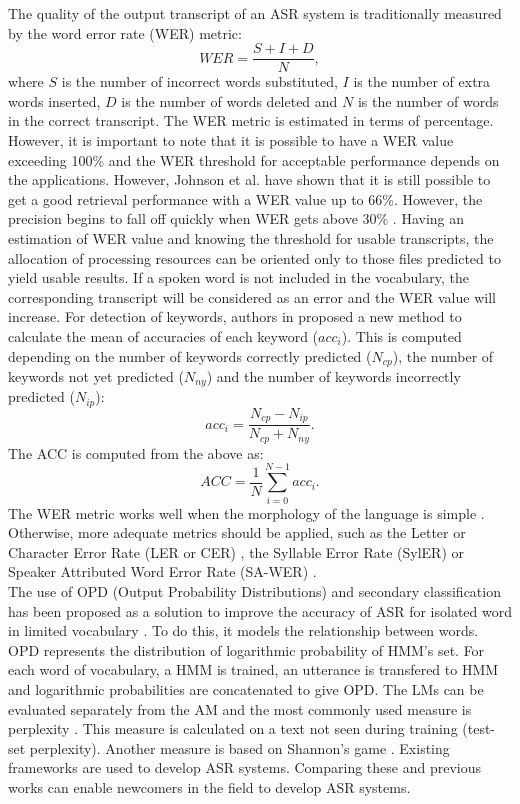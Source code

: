 The quality of the output transcript of an ASR system is traditionally measured by the word error rate (WER) metric:
\begin{equation}
    WER=\frac{S+I+D}{N},	
\end{equation}
where $S$ is the number of incorrect words substituted, $I$ is the number of extra words inserted, $D$ is the number of words deleted and $N$ is the number of words in the correct transcript. The WER metric is estimated in terms of percentage. However, it is important to note that it is possible to have a WER value exceeding 100\% and the WER threshold for acceptable performance depends on the applications. However, Johnson et al.  have shown that it is still possible to get a good retrieval performance with a WER value up to 66\%. However, the precision begins to fall off quickly when WER gets above 30\% . Having an estimation of WER value and knowing the threshold for usable transcripts, the allocation of processing resources can be oriented only to those files predicted to yield usable results. If a spoken word is not included in the vocabulary, the corresponding transcript will be considered as an error and the WER value will increase.
For detection of keywords,  authors in  proposed a new method to calculate the mean of accuracies of each keyword ($acc_i$). This is computed depending on the number of keywords correctly predicted ($N_{cp}$), the number of keywords not yet predicted ($N_{ny}$) and the number of keywords incorrectly predicted ($N_{ip}$):
\begin{equation}
    acc_i=\frac{N_{cp}-N_{ip}}{N_{cp}+N_{ny}}.
\end{equation}
The ACC is computed from the above as:
\begin{equation}
   ACC=\frac{1}{N} \sum_{i=0}^{N-1}acc_i. 
\end{equation}
The WER metric works well when the morphology of the language is simple . Otherwise, more adequate metrics should be applied, such as the Letter or Character Error Rate (LER or CER) , the Syllable Error Rate (SylER)  or Speaker Attributed Word Error Rate (SA-WER) .\\
The use of OPD (Output Probability Distributions) and secondary classification has been proposed as a solution to improve the accuracy of ASR for isolated word in limited vocabulary . To do this, it models the relationship between words. OPD represents the distribution of logarithmic probability of HMM’s set. For each word of vocabulary, a HMM is trained, an utterance is transfered to HMM and logarithmic probabilities are concatenated to give OPD. 
The LMs can be evaluated separately from the AM and the most commonly used measure is perplexity . This measure is calculated on a text not seen during training (test-set perplexity). Another measure is based on Shannon's game . 
Existing frameworks are used to develop ASR systems. Comparing these and previous works can enable newcomers in the field to develop ASR systems.

